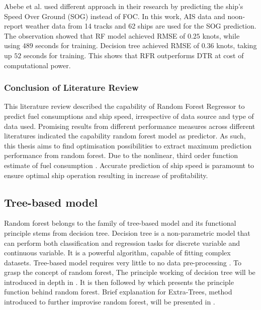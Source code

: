 Abebe et al. \cite{Abebe.2020} used different approach in their research by predicting the ship's Speed Over Ground (SOG) instead of FOC. In this work, AIS data and noon-report weather data from 14 tracks and 62 ships are used for the SOG prediction. The observation showed that RF model achieved RMSE of $0.25$ knots, while using $489$ seconds for training. Decision tree achieved RMSE of $0.36$ knots, taking up $52$ seconds for training. This shows that RFR outperforms DTR at cost of computational power.\\

\subsubsection{Conclusion of Literature Review}\label{lit_review_conclusion}

This literature review described the capability of Random Forest Regressor to predict fuel consumptions and ship speed, irrespective of data source and type of data used. Promising results from different performance measures across different literatures indicated the capability random forest model as predictor. As such, this thesis aims to find optimisation possibilities to extract maximum prediction performance from random forest. Due to the nonlinear, third order function estimate of fuel consumption \cite{Ronen.1982,Ronen.2011}. Accurate prediction of ship speed is paramount to ensure optimal ship operation resulting in increase of profitability. 

\subsection{Tree-based model}\label{tree_intro}

Random forest belongs to the family of tree-based model and its functional principle stems from decision tree. Decision tree is a non-parametric model that can perform both classification and regression tasks for discrete variable and continuous variable. It is a powerful algorithm, capable of fitting complex datasets. Tree-based model requires very little to no data pre-processing \cite{Geron.2019,Hastie.2009}. To grasp the concept of random forest, The principle working of decision tree will be introduced in depth in . It is then followed by  which presents the principle function behind random forest. Brief explanation for Extra-Trees, method introduced to further improvise random forest, will be presented in .\\

